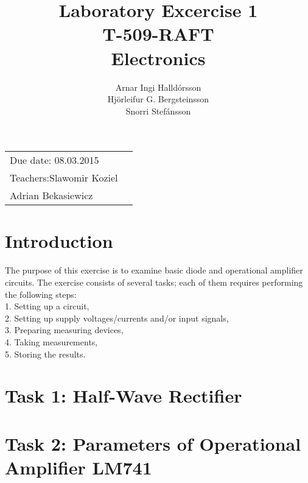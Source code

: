 \documentclass[11pt,a4paper]{article}
\title{Laboratory Excercise 1 \\ T-509-RAFT \\ Electronics} %
\author{Arnar Ingi Halldórsson \\ Hjörleifur G. Bergsteinsson \\ Snorri Stefánsson} %
\begin{document}
\maketitle %

\begin{tabular}{lr}
    Due date: 08.03.2015 \\
    Teachers:\qquad Slawomir Koziel\\ %
\qquad \qquad \qquad Adrian Bekasiewicz
\end{tabular}

\setlength\parindent{0pt} %

\renewcommand{\labelenumi}{\alph{enumi}.} %

\section*{Introduction}

    The  purpose  of  this  exercise  is to  examine  basic  diode  and  operational  amplifier  circuits. The exercise consists of several tasks; each of them requires performing the following steps:\\
        1. Setting up a circuit,\\
        2. Setting up supply voltages/currents and/or input signals, \\
        3. Preparing measuring devices, \\
        4. Taking measurements, \\
        5. Storing the results. \\

\pagebreak

\section*{Task 1: Half-Wave Rectifier}
    
\pagebreak
\section*{Task 2: Parameters of Operational Amplifier LM741}
    
\end{document}
